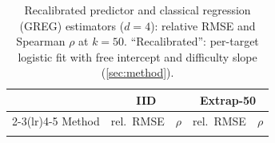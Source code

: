 \begin{table}[h]
\caption{Recalibrated predictor and classical regression (GREG) estimators ($d=4$): relative RMSE and Spearman $\rho$ at $k=50$. ``Recalibrated'': per-target logistic fit with free intercept and difficulty slope (\cref{sec:method}).}
\label{tab:abl_cal}
\centering\footnotesize
\begin{tabular}{lcccc}
\toprule
 & \multicolumn{2}{c}{IID} & \multicolumn{2}{c}{Extrap-50}\\
\cmidrule(lr){2-3}\cmidrule(lr){4-5}
Method & rel.\ RMSE & $\rho$ & rel.\ RMSE & $\rho$\\
\midrule
\\
\bottomrule
\end{tabular}
\end{table}
